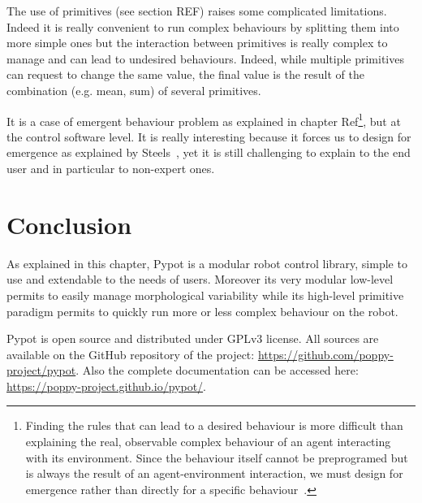 The use of primitives (see section REF) raises some complicated limitations. Indeed it is really convenient to run complex behaviours by splitting them into more simple ones but the interaction between primitives is really complex to manage and can lead to undesired behaviours. Indeed, while multiple primitives can request to change the same value, the final value is the result of the combination (e.g. mean, sum) of several primitives.


It is a case of emergent behaviour problem as explained in chapter Ref\footnote{Finding the rules that can lead to a desired behaviour is more difficult than explaining the real, observable complex behaviour of an agent interacting with its environment. Since the behaviour itself cannot be preprogramed but is always the result of an agent-environment interaction, we must design for emergence rather than directly for a specific behaviour~\parencite{Pfeifer06}.}, but at the control software level. It is really interesting because it forces us to design  for emergence as explained by Steels~\parencite{Steels1991emergence}, yet it is still challenging to explain to the end user and in particular to non-expert ones.


\section{Conclusion} %

As explained in this chapter, Pypot is a modular robot control library, simple to use and extendable to the needs of users. Moreover its very modular low-level permits to easily manage morphological variability while its high-level primitive paradigm permits to quickly run more or less complex behaviour on the robot.

Pypot is open source and distributed under GPLv3 license. All sources are available on the GitHub repository of the project: \url{https://github.com/poppy-project/pypot}. Also the complete documentation can be accessed here: \url{https://poppy-project.github.io/pypot/}.





% 



